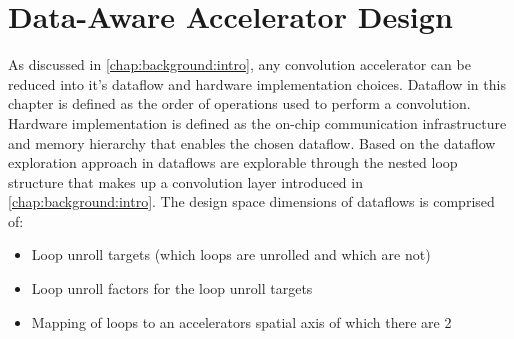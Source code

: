 \chapter{Data-Aware Accelerator Design}
\label{chap:dda}

As discussed in \autoref{chap:background:intro}, any convolution accelerator can
be reduced into it's dataflow and hardware implementation choices. Dataflow in
this chapter is defined as the order of operations used to perform a
convolution. Hardware implementation is defined as the on-chip communication
infrastructure and memory hierarchy that
enables the chosen dataflow. Based on the dataflow exploration approach in
\cite{dnn_df_overrated_v1} dataflows are explorable through the nested loop
structure that makes up a convolution layer introduced in
\autoref{chap:background:intro}. The design space dimensions of dataflows is
comprised of:

\begin{itemize}
    \item Loop unroll targets (which loops are unrolled and which are not) 
    \item Loop unroll factors for the loop unroll targets
    \item Mapping of loops to an accelerators spatial axis of which there are 2
\end{itemize}

